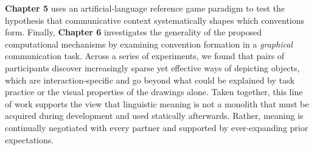 \textbf{Chapter 5} uses an artificial-language reference game paradigm to test the hypothesis that communicative context systematically shapes which conventions form.
Finally, \textbf{Chapter 6} investigates the generality of the proposed computational mechanisms by examining convention formation in a \emph{graphical} communication task.
Across a series of experiments, we found that pairs of participants discover increasingly sparse yet effective ways of depicting objects, which are interaction-specific and go beyond what could be explained by task practice or the visual properties of the drawings alone.
Taken together, this line of work supports the view that linguistic meaning is not a monolith that must be acquired during development and used statically afterwards.
Rather, meaning is continually negotiated with every partner and supported by ever-expanding prior expectations.
